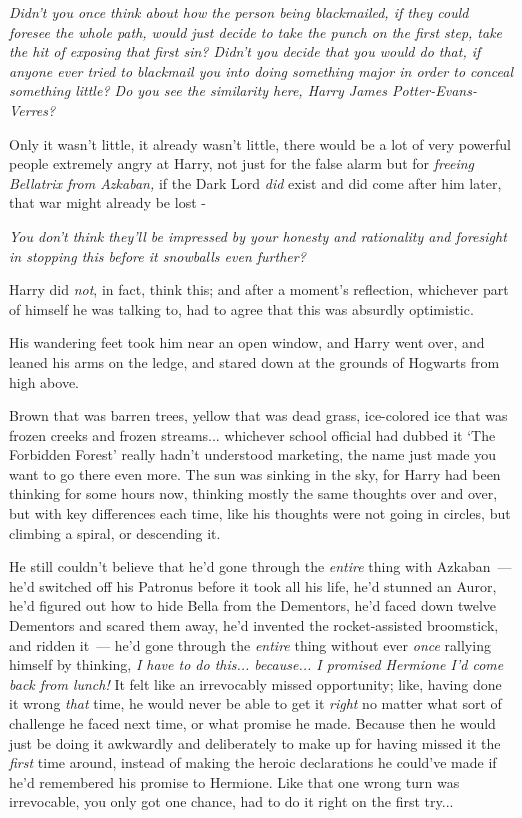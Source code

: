 \emph{Didn't you once think about how the person being blackmailed, if they could foresee the whole path, would just decide to take the punch on the first step, take the hit of exposing that first sin? Didn't you decide that you would do that, if anyone ever tried to blackmail you into doing something major in order to conceal something little? Do you see the similarity here, Harry James Potter-Evans-Verres?}

Only it wasn't little, it already wasn't little, there would be a lot of very powerful people extremely angry at Harry, not just for the false alarm but for \emph{freeing Bellatrix from Azkaban,} if the Dark Lord \emph{did} exist and did come after him later, that war might already be lost -

\emph{You don't think they'll be impressed by your honesty and rationality and foresight in stopping this before it snowballs even further?}

Harry did \emph{not}, in fact, think this; and after a moment's reflection, whichever part of himself he was talking to, had to agree that this was absurdly optimistic.

His wandering feet took him near an open window, and Harry went over, and leaned his arms on the ledge, and stared down at the grounds of Hogwarts from high above.

Brown that was barren trees, yellow that was dead grass, ice-colored ice that was frozen creeks and frozen streams... whichever school official had dubbed it `The Forbidden Forest' really hadn't understood marketing, the name just made you want to go there even more. The sun was sinking in the sky, for Harry had been thinking for some hours now, thinking mostly the same thoughts over and over, but with key differences each time, like his thoughts were not going in circles, but climbing a spiral, or descending it.

He still couldn't believe that he'd gone through the \emph{entire} thing with Azkaban~--- he'd switched off his Patronus before it took all his life, he'd stunned an Auror, he'd figured out how to hide Bella from the Dementors, he'd faced down twelve Dementors and scared them away, he'd invented the rocket-assisted broomstick, and ridden it~--- he'd gone through the \emph{entire} thing without ever \emph{once} rallying himself by thinking, \emph{I have to do this... because... I promised Hermione I'd come back from lunch!} It felt like an irrevocably missed opportunity; like, having done it wrong \emph{that} time, he would never be able to get it \emph{right} no matter what sort of challenge he faced next time, or what promise he made. Because then he would just be doing it awkwardly and deliberately to make up for having missed it the \emph{first} time around, instead of making the heroic declarations he could've made if he'd remembered his promise to Hermione. Like that one wrong turn was irrevocable, you only got one chance, had to do it right on the first try...

